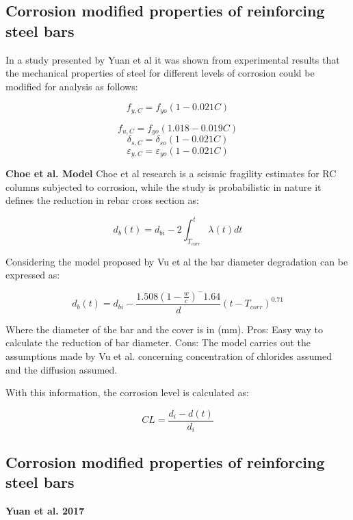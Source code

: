 \subsection{Corrosion modified properties of reinforcing steel bars}

In a study presented by Yuan et al \cite{Yuan2000} it was shown from experimental results that the mechanical properties of steel for different levels of corrosion could be modified for analysis as follows:

\begin{equation}
  f_{y,C}=f_{yo}(1-0.021C)
  \label{eq.eight}
\end{equation} 

\[
  f_{u,C}=f_{yo}(1.018-0.019C)
\]
\[
  \delta_{s,C}=\delta_{so}(1-0.021C)
\]
\[
  \varepsilon_{y,C}=\varepsilon_{yo}(1-0.021C)
\]


\textbf{Choe et al. Model }
Choe et al research is a seismic fragility estimates for RC columns subjected to corrosion, while the study is probabilistic in nature it defines the reduction in rebar cross section as:

\begin{equation}
	d_{b}(t)=d_{bi}-2\int_{T_{corr}}^{t} \lambda(t) dt
\end{equation}

Considering the model proposed by Vu et al the bar diameter degradation can be expressed as:

\begin{equation}
	d_{b}(t)=d_{bi}-\frac{1.508(1-\frac{w}{c})^-1.64}{d}(t-T_{corr})^0.71
\end{equation}

Where the diameter of the bar and the cover is in (mm).
Pros:
Easy way to calculate the reduction of bar diameter.
Cons:
The model carries out the assumptions made by Vu et al. concerning concentration of chlorides assumed and the diffusion assumed.

With this information, the corrosion level is calculated as:

\begin{equation}
	CL=\frac{d_{i}-d(t)}{d_{i}}
\end{equation}

\subsection{Corrosion modified properties of reinforcing steel bars}

\textbf{Yuan et al. 2017}

